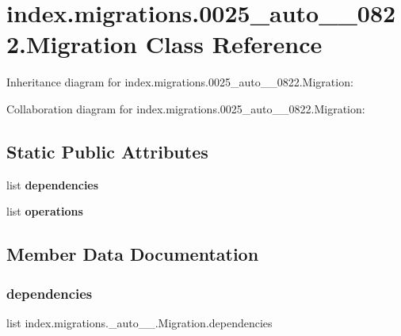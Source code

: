 \hypertarget{classindex_1_1migrations_1_10025__auto__20171026__0822_1_1Migration}{}\section{index.\+migrations.0025\+\_\+auto\+\_\+\_\+0822.Migration Class Reference}
\label{classindex_1_1migrations_1_10025__auto__20171026__0822_1_1Migration}


Inheritance diagram for index.\+migrations.0025\+\_\+auto\+\_\+\_\+0822.Migration\+:


Collaboration diagram for index.\+migrations.0025\+\_\+auto\+\_\+\_\+0822.Migration\+:
\subsection*{Static Public Attributes}
\begin{DoxyCompactItemize}
\item 
list {\bfseries dependencies}
\item 
list {\bfseries operations}
\end{DoxyCompactItemize}


\subsection{Member Data Documentation}
\mbox{\label{classindex_1_1migrations_1_10025__auto__20171026__0822_1_1Migration_ad6faf89c7721904e628015b7a5fc2db7}} 
\subsubsection{\texorpdfstring{dependencies}{dependencies}}
{\footnotesize\ttfamily list index.\+migrations.\+\_\+auto\+\_\+\_.\+Migration.\+dependencies\hspace{0.3cm}{\ttfamily [static]}}

